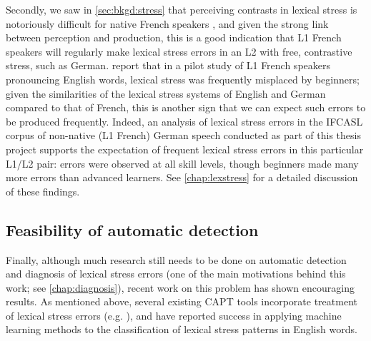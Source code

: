Secondly, we saw in \cref{sec:bkgd:stress} that perceiving contrasts in lexical stress is notoriously difficult for native French speakers \citep{Cutler2005,Dupoux2008}, and given the strong link between perception and production,
this is a good indication that L1 French speakers will regularly make lexical stress errors in an L2 with free, contrastive stress, such as German. \textcite{Bonneau2011} report that in a pilot study of L1 French speakers pronouncing English words, lexical stress was frequently misplaced by beginners; given the similarities of the lexical stress systems of English and German compared to that of French, this is another sign that we can expect such errors to be produced frequently.
%
Indeed, an analysis of lexical stress errors in the IFCASL corpus of non-native (L1 French) German speech conducted as part of this thesis project supports the expectation of frequent lexical stress errors in this particular L1/L2 pair: 
errors were observed at all skill levels, though beginners made many more errors than advanced learners. See \cref{chap:lexstress} for a detailed discussion of these findings.
	

		\subsection{Feasibility of automatic detection}
		\label{sec:targeting:autodetect}

Finally, although much research still needs to be done on automatic detection and diagnosis of lexical stress errors (one of the main motivations behind this work; see \cref{chap:diagnosis}), recent work on this problem has shown encouraging results. As mentioned above, several existing CAPT tools incorporate treatment of lexical stress errors (e.g. \cite{Wik2009,Bonneau2011}), and \textcite{Shahin2012a,Kim2011} have reported success in applying machine learning methods to the classification of lexical stress patterns in English words. 





